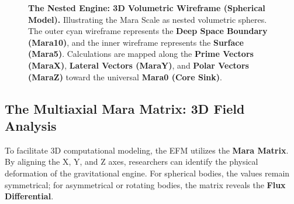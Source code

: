 \documentclass[11pt, a4paper]{article}
\begin{document}
\begin{figure}[!ht]
  \caption{\textbf{The Nested Engine: 3D Volumetric Wireframe (Spherical Model).} Illustrating the Mara Scale as nested volumetric spheres. The outer cyan wireframe represents the \textbf{Deep Space Boundary (Mara10)}, and the inner wireframe represents the \textbf{Surface (Mara5)}. Calculations are mapped along the \textbf{Prime Vectors (MaraX)}, \textbf{Lateral Vectors (MaraY)}, and \textbf{Polar Vectors (MaraZ)} toward the universal \textbf{Mara0 (Core Sink)}.}
  \label{fig:nested_spheres_3d}
\end{figure}

\clearpage
\subsection{The Multiaxial Mara Matrix: 3D Field Analysis}

To facilitate 3D computational modeling, the EFM utilizes the \textbf{Mara Matrix}. By aligning the X, Y, and Z axes, researchers can identify the physical deformation of the gravitational engine. For spherical bodies, the values remain symmetrical; for asymmetrical or rotating bodies, the matrix reveals the \textbf{Flux Differential}.
\end{document}
